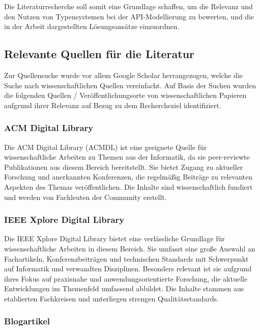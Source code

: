 Die Literaturrecherche soll somit eine Grundlage schaffen, 
um die Relevanz und den Nutzen von Typensystemen bei der API-Modellierung zu bewerten,
und die in der Arbeit dargestellten Lösungsansätze einzuordnen.

\subsection{Relevante Quellen für die Literatur}

Zur Quellensuche wurde vor allem Google Scholar herrangezogen, welche die Suche nach wissenschaftlichen Quellen
vereinfacht.
Auf Basis der Suchen wurden die folgenden Quellen / Veröffentlichungsorte von wissenschaftlichen Papieren aufgrund ihrer Relevanz
auf Bezug zu dem Rechercheziel identifiziert.

\subsubsection{ACM Digital Library}

Die ACM Digital Library (ACMDL) ist eine geeignete Quelle für wissenschaftliche Arbeiten 
zu Themen aus der Informatik, da sie peer-reviewte Publikationen aus diesem Bereich bereitstellt.
Sie bietet Zugang zu aktueller Forschung und anerkannten Konferenzen,
die regelmäßig Beiträge zu relevanten Aspekten des Themas veröffentlichen.
Die Inhalte sind wissenschaftlich fundiert und werden von Fachleuten der Community erstellt. \cite{ACM}

\subsubsection{IEEE Xplore Digital Library}

Die IEEE Xplore Digital Library bietet eine verlässliche Grundlage für wissenschaftliche Arbeiten
in diesem Bereich.
Sie umfasst eine große Auswahl an Fachartikeln, Konferenzbeiträgen und technischen Standards 
mit Schwerpunkt auf Informatik und verwandten Disziplinen.
Besonders relevant ist sie aufgrund ihres Fokus auf praxisnahe und anwendungsorientierte Forschung,
die aktuelle Entwicklungen im Themenfeld umfassend abbildet.
Die Inhalte stammen aus etablierten Fachkreisen und unterliegen strengen Qualitätsstandards. \cite{IEEE}

\subsubsection{Blogartikel}


